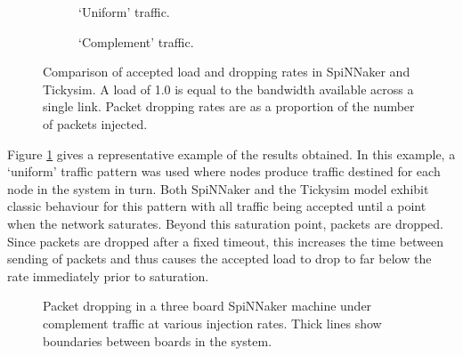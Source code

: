 			\begin{figure}
				\begin{subfigure}{\textwidth}
					
					
					\caption{`Uniform' traffic.}
					\label{fig:results-144-accuracy-cyclic}
				\end{subfigure}
				
				\vspace{1em}
				
				\begin{subfigure}{\textwidth}
					
					
					\caption{`Complement' traffic.}
					\label{fig:results-144-accuracy-complement}
				\end{subfigure}
				
				\caption[Packet acceptance and dropping in SpiNNaker
				and TIckysim.]{Comparison of accepted load and dropping rates in
				SpiNNaker and Tickysim. A load of 1.0 is equal to the bandwidth
				available across a single link. Packet dropping rates are as a
				proportion of the number of packets injected.}
				\label{fig:results-144-accuracy}
			\end{figure}
			
			Figure \ref{fig:results-144-accuracy-cyclic} gives a representative
			example of the results obtained. In this example, a `uniform' traffic
			pattern was used where nodes produce traffic destined for each node in the
			system in turn. Both SpiNNaker and the Tickysim model exhibit classic
			behaviour for this pattern with all traffic being accepted until a point
			when the network saturates.  Beyond this saturation point, packets are
			dropped. Since packets are dropped after a fixed timeout, this increases
			the time between sending of packets and thus causes the accepted load to
			drop to far below the rate immediately prior to saturation.
			
			\begin{figure}
				\center
				
				\caption[Packet dropping in a three board SpiNNaker machine.]{Packet
				dropping in a three board SpiNNaker machine under complement traffic at
				various injection rates. Thick lines show boundaries between boards in
				the system.}
				\label{fig:heatmap-spinnaker-complement}
			\end{figure}
			
